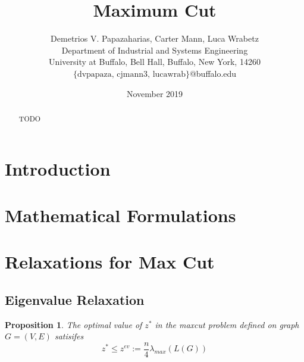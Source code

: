 \documentclass[12pt]{article}
\title{Maximum Cut}
\author{Demetrios V. Papazaharias, Carter Mann, Luca Wrabetz\\ \small Department of Industrial and Systems Engineering \\
\small University at Buffalo, Bell Hall, Buffalo, New York, 14260\\\small $\lbrace \text{dvpapaza, cjmann3, lucawrab}\rbrace$@buffalo.edu}
\date{November 2019}
\theoremstyle{plain}
\newtheorem{prop}{Proposition}
\theoremstyle{definition}
\begin{document}
\maketitle
\begin{abstract}
    TODO
\end{abstract}

\clearpage
\newcommand{\norm}[1]{\left\lVert#1\right\rVert}
\section{Introduction}\label{sec:Introduction}
\section{Mathematical Formulations}\label{sec:Formulations}
\section{Relaxations for Max Cut}\label{sec:Relaxations}
\subsection{Eigenvalue Relaxation}\label{subsec:Eigenvalue}

\begin{prop}
The optimal value of $z^*$ in the maxcut problem defined on graph $G=(V,E)$ satisifes
\[
    z^* \leq z^{ev} := \dfrac{n}{4} \lambda_{max}(L(G))
\]
\end{prop}
\end{document}
